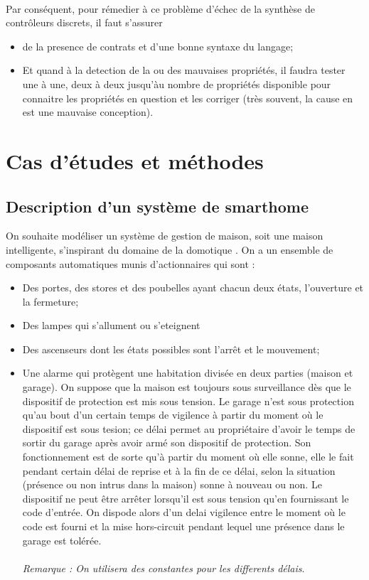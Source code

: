 \documentclass{svjour3}
\begin{document}
\paragraph{}
\label{sec:3}
 Par conséquent, pour rémedier à ce problème d'échec de la synthèse de contrôleurs discrets, il faut s'assurer
 \begin{itemize}
 \item de la presence de contrats et d'une bonne syntaxe du langage;
 \item Et quand à la detection de la ou des mauvaises propriétés, il faudra tester une à une, deux à deux jusqu'àu nombre de propriétés disponible pour connaitre
  les propriétés en question et les corriger (très souvent, la cause en est une mauvaise conception).
\end{itemize}
\section{Cas d'études et méthodes}
\subsection{Description d'un système de \large{smarthome}}
On souhaite modéliser un système de gestion de maison, soit une maison intelligente, s'inspirant du domaine de la domotique \footnotemark[1]. 
On a un ensemble de composants automatiques munis d'actionnaires qui sont :
\begin{itemize}
 \item Des portes, des stores et des poubelles ayant chacun deux états, l'ouverture et la fermeture;
 \item Des lampes qui s'allument ou s'eteignent
 \item Des ascenseurs dont les états possibles sont l'arrêt et le mouvement;
 \item Une alarme qui protègent une habitation divisée en deux parties (maison et garage). On suppose que la maison est toujours sous surveillance dès
 que le dispositif de protection est mis sous tension. Le garage n'est sous protection qu'au bout d'un certain temps de vigilence à partir du moment 
 où le dispositif est sous tesion; ce délai permet au propriétaire d'avoir le temps de sortir du garage après avoir armé son dispositif de protection. 
 Son fonctionnement est de sorte qu'à partir du moment où elle sonne, elle le fait pendant certain délai de reprise et à la fin de ce délai, 
 selon la situation (présence ou non intrus dans la maison) sonne  à nouveau ou non. Le dispositif ne peut être arrêter lorsqu'il est sous tension qu'en 
 fournissant le code d'entrée. On dispode alors d'un delai vigilence entre le moment où le code est fourni et la mise hors-circuit pendant lequel une 
 présence dans le garage est tolérée. 
 \paragraph{}
 \textit{Remarque : On utilisera des constantes pour les differents délais}.
\end{itemize}
\end{document}
